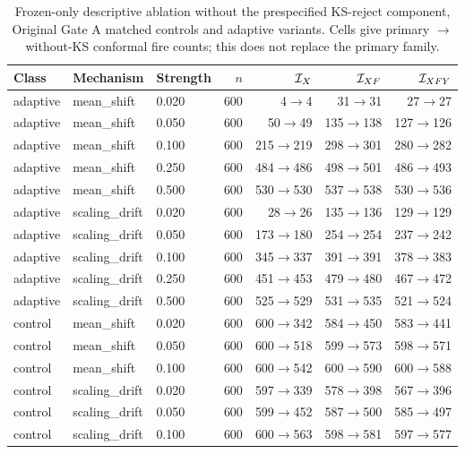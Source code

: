 \begin{table}[!t]
\caption{Frozen-only descriptive ablation without the prespecified KS-reject component, Original Gate A matched controls and adaptive variants. Cells give primary $\rightarrow$ without-KS conformal fire counts; this does not replace the primary family.}
\label{tab:v137-without-ks-4}
\centering\footnotesize\renewcommand{\arraystretch}{0.90}\setlength{\tabcolsep}{4pt}
\begin{tabular}{@{}lllrrrr@{}}
\toprule
Class & Mechanism & Strength & $n$ & $\mathcal I_X$ & $\mathcal I_{XF}$ & $\mathcal I_{XFY}$ \\
\midrule
adaptive & mean\_shift & 0.020 & 600 & 4$\rightarrow$4 & 31$\rightarrow$31 & 27$\rightarrow$27 \\
adaptive & mean\_shift & 0.050 & 600 & 50$\rightarrow$49 & 135$\rightarrow$138 & 127$\rightarrow$126 \\
adaptive & mean\_shift & 0.100 & 600 & 215$\rightarrow$219 & 298$\rightarrow$301 & 280$\rightarrow$282 \\
adaptive & mean\_shift & 0.250 & 600 & 484$\rightarrow$486 & 498$\rightarrow$501 & 486$\rightarrow$493 \\
adaptive & mean\_shift & 0.500 & 600 & 530$\rightarrow$530 & 537$\rightarrow$538 & 530$\rightarrow$536 \\
adaptive & scaling\_drift & 0.020 & 600 & 28$\rightarrow$26 & 135$\rightarrow$136 & 129$\rightarrow$129 \\
adaptive & scaling\_drift & 0.050 & 600 & 173$\rightarrow$180 & 254$\rightarrow$254 & 237$\rightarrow$242 \\
adaptive & scaling\_drift & 0.100 & 600 & 345$\rightarrow$337 & 391$\rightarrow$391 & 378$\rightarrow$383 \\
adaptive & scaling\_drift & 0.250 & 600 & 451$\rightarrow$453 & 479$\rightarrow$480 & 467$\rightarrow$472 \\
adaptive & scaling\_drift & 0.500 & 600 & 525$\rightarrow$529 & 531$\rightarrow$535 & 521$\rightarrow$524 \\
control & mean\_shift & 0.020 & 600 & 600$\rightarrow$342 & 584$\rightarrow$450 & 583$\rightarrow$441 \\
control & mean\_shift & 0.050 & 600 & 600$\rightarrow$518 & 599$\rightarrow$573 & 598$\rightarrow$571 \\
control & mean\_shift & 0.100 & 600 & 600$\rightarrow$542 & 600$\rightarrow$590 & 600$\rightarrow$588 \\
control & scaling\_drift & 0.020 & 600 & 597$\rightarrow$339 & 578$\rightarrow$398 & 567$\rightarrow$396 \\
control & scaling\_drift & 0.050 & 600 & 599$\rightarrow$452 & 587$\rightarrow$500 & 585$\rightarrow$497 \\
control & scaling\_drift & 0.100 & 600 & 600$\rightarrow$563 & 598$\rightarrow$581 & 597$\rightarrow$577 \\
\bottomrule
\end{tabular}
\end{table}


